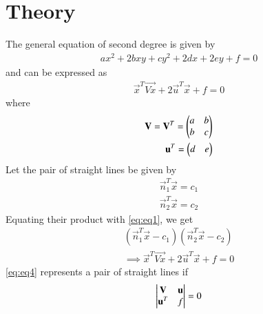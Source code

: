 \documentclass[journal,12pt,twocolumn]{IEEEtran}
\begin{document}
\section{Theory}
The general equation of second degree is given by 
\begin{align} 
	ax^2 + 2bxy + cy^2 + 2dx + 2ey + f = 0 
\end{align}
and can be expressed as 
\begin{align}
	\vec{x}^T\vec{Vx} + 2\vec{u}^T\vec{x} + f = 0 \label{eq:eq1}
\end{align}
where 
\begin{align}
	\mathbf{V} = \mathbf{V}^T = \begin{pmatrix}a & b\\b & c\end{pmatrix} \label{eq:eq2} \\
	\mathbf{u}^T = \begin{pmatrix}d & e\end{pmatrix} \label{eq:eq3}
\end{align}
Let the pair of straight lines be given by 
\begin{align}
	\vec{n}_1^T\vec{x} = c_1\\
	\vec{n}_2^T\vec{x} = c_2
\end{align}
Equating their product with \eqref{eq:eq1}, we get
\begin{align}
	(\vec{n}_1^T\vec{x} - c_1)(\vec{n}_2^T\vec{x} - c_2) \nonumber \\
	\implies \vec{x}^T\vec{Vx} + 2\vec{u}^T\vec{x} + f = 0 \label{eq:eq4}
\end{align}
\eqref{eq:eq4} represents a pair of straight lines if
\begin{align} \label{eq:det1}
	\begin{vmatrix}\mathbf{V} & \mathbf{u} \\ \mathbf{u}^T & f\end{vmatrix} = 0
\end{align}
\end{document}
